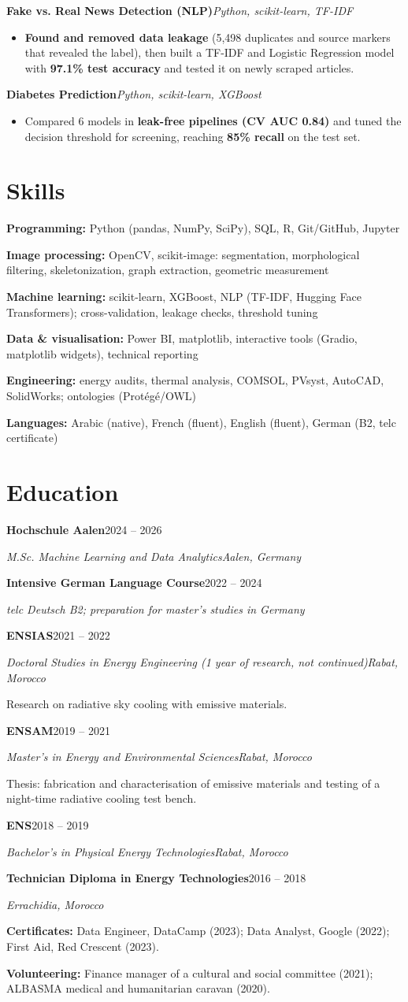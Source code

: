 \documentclass[10pt,a4paper]{article}
\newcommand{\org}[4]{%
  \par\vspace{4pt}\noindent\textbf{#1}\hfill #2\par
  \noindent\textit{#3}\hfill\textit{#4}\par}
\newcommand{\project}[2]{\par\vspace{4pt}\noindent\textbf{#1}\hfill\textit{#2}\par}
\begin{document}
\project{Fake vs. Real News Detection (NLP)}{Python, scikit-learn, TF-IDF}
\begin{itemize}
  \item \textbf{Found and removed data leakage} (5,498 duplicates and source markers that revealed the label), then built a TF-IDF and Logistic Regression model with \textbf{97.1\% test accuracy} and tested it on newly scraped articles.
\end{itemize}

\project{Diabetes Prediction}{Python, scikit-learn, XGBoost}
\begin{itemize}
  \item Compared 6 models in \textbf{leak-free pipelines (CV AUC 0.84)} and tuned the decision threshold for screening, reaching \textbf{85\% recall} on the test set.
\end{itemize}

\section{Skills}
\textbf{Programming:} Python (pandas, NumPy, SciPy), SQL, R, Git/GitHub, Jupyter\par
\textbf{Image processing:} OpenCV, scikit-image: segmentation, morphological filtering, skeletonization, graph extraction, geometric measurement\par
\textbf{Machine learning:} scikit-learn, XGBoost, NLP (TF-IDF, Hugging Face Transformers); cross-validation, leakage checks, threshold tuning\par
\textbf{Data \& visualisation:} Power BI, matplotlib, interactive tools (Gradio, matplotlib widgets), technical reporting\par
\textbf{Engineering:} energy audits, thermal analysis, COMSOL, PVsyst, AutoCAD, SolidWorks; ontologies (Protégé/OWL)\par
\textbf{Languages:} Arabic (native), French (fluent), English (fluent), German (B2, telc certificate)\par

\section{Education}
\org{Hochschule Aalen}{2024 -- 2026}{M.Sc. Machine Learning and Data Analytics}{Aalen, Germany}
\org{Intensive German Language Course}{2022 -- 2024}{telc Deutsch B2; preparation for master's studies in Germany}{}
\org{ENSIAS}{2021 -- 2022}{Doctoral Studies in Energy Engineering (1 year of research, not continued)}{Rabat, Morocco}
\noindent Research on radiative sky cooling with emissive materials.\par
\org{ENSAM}{2019 -- 2021}{Master's in Energy and Environmental Sciences}{Rabat, Morocco}
\noindent Thesis: fabrication and characterisation of emissive materials and testing of a night-time radiative cooling test bench.\par
\org{ENS}{2018 -- 2019}{Bachelor's in Physical Energy Technologies}{Rabat, Morocco}
\org{Technician Diploma in Energy Technologies}{2016 -- 2018}{}{Errachidia, Morocco}

\vspace{5pt}
\textbf{Certificates:} Data Engineer, DataCamp (2023); Data Analyst, Google (2022); First Aid, Red Crescent (2023).\par
\textbf{Volunteering:} Finance manager of a cultural and social committee (2021); ALBASMA medical and humanitarian caravan (2020).\par
\end{document}
